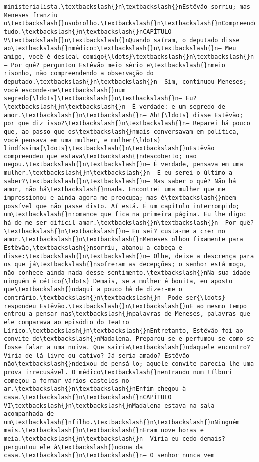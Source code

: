 \documentclass[11pt]{article}
\begin{document}
\begin{Verbatim}[commandchars=\\\{\}]
ministerialista.\textbackslash{}n\textbackslash{}nEstêvão sorriu; mas Meneses franziu o\textbackslash{}nsobrolho.\textbackslash{}n\textbackslash{}nCompreendera tudo.\textbackslash{}n\textbackslash{}nCAPÍTULO V\textbackslash{}n\textbackslash{}nQuando saíram, o deputado disse ao\textbackslash{}nmédico:\textbackslash{}n\textbackslash{}n— Meu amigo, você é desleal comigo{\ldots}\textbackslash{}n\textbackslash{}n— Por quê? perguntou Estêvão meio sério e\textbackslash{}nmeio risonho, não compreendendo a observação do deputado.\textbackslash{}n\textbackslash{}n— Sim, continuou Meneses; você esconde-me\textbackslash{}num segredo{\ldots}\textbackslash{}n\textbackslash{}n— Eu?\textbackslash{}n\textbackslash{}n— É verdade: e um segredo de amor.\textbackslash{}n\textbackslash{}n— Ah!{\ldots} disse Estêvão; por que diz isso?\textbackslash{}n\textbackslash{}n— Reparei há pouco que, ao passo que os\textbackslash{}nmais conversavam em política, você pensava em uma mulher, e mulher{\ldots} lindíssima{\ldots}\textbackslash{}n\textbackslash{}nEstêvão compreendeu que estava\textbackslash{}ndescoberto; não negou.\textbackslash{}n\textbackslash{}n— É verdade, pensava em uma mulher.\textbackslash{}n\textbackslash{}n— E eu serei o último a saber?\textbackslash{}n\textbackslash{}n— Mas saber o quê? Não há amor, não há\textbackslash{}nnada. Encontrei uma mulher que me impressionou e ainda agora me preocupa; mas é\textbackslash{}nbem possível que não passe disto. Aí está. É um capítulo interrompido; um\textbackslash{}nromance que fica na primeira página. Eu lhe digo: há de me ser difícil amar.\textbackslash{}n\textbackslash{}n— Por quê?\textbackslash{}n\textbackslash{}n— Eu sei? custa-me a crer no amor.\textbackslash{}n\textbackslash{}nMeneses olhou fixamente para Estêvão,\textbackslash{}nsorriu, abanou a cabeça e disse:\textbackslash{}n\textbackslash{}n— Olhe, deixe a descrença para os que já\textbackslash{}nsofreram as decepções; o senhor está moço, não conhece ainda nada desse sentimento.\textbackslash{}nNa sua idade ninguém é cético{\ldots} Demais, se a mulher é bonita, eu aposto que\textbackslash{}ndaqui a pouco há de dizer-me o contrário.\textbackslash{}n\textbackslash{}n— Pode ser{\ldots} respondeu Estêvão.\textbackslash{}n\textbackslash{}nE ao mesmo tempo entrou a pensar nas\textbackslash{}npalavras de Meneses, palavras que ele comparava ao episódio do Teatro Lírico.\textbackslash{}n\textbackslash{}nEntretanto, Estêvão foi ao convite de\textbackslash{}nMadalena. Preparou-se e perfumou-se como se fosse falar a uma noiva. Que sairia\textbackslash{}ndaquele encontro? Viria de lá livre ou cativo? Já seria amado? Estêvão não\textbackslash{}ndeixou de pensá-lo; aquele convite parecia-lhe uma prova irrecusável. O médico\textbackslash{}nentrando num tílburi começou a formar vários castelos no ar.\textbackslash{}n\textbackslash{}nEnfim chegou à casa.\textbackslash{}n\textbackslash{}nCAPÍTULO VI\textbackslash{}n\textbackslash{}nMadalena estava na sala acompanhada de um\textbackslash{}nfilho.\textbackslash{}n\textbackslash{}nNinguém mais.\textbackslash{}n\textbackslash{}nEram nove horas e meia.\textbackslash{}n\textbackslash{}n— Viria eu cedo demais? perguntou ele à\textbackslash{}ndona da casa.\textbackslash{}n\textbackslash{}n— O senhor nunca vem 
\end{Verbatim}
\end{document}
